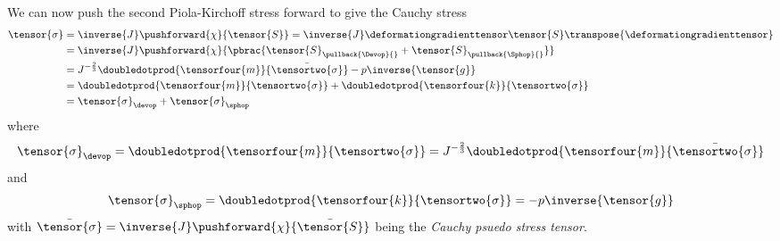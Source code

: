 We can now push the second Piola-Kirchoff stress forward to give the Cauchy
stress \ie
\begin{equation}
  \begin{split}
    \tensor{\sigma}&=\inverse{J}\pushforward{\chi}{\tensor{S}}=\inverse{J}\deformationgradienttensor\tensor{S}\transpose{\deformationgradienttensor}
    \\
    &=\inverse{J}\pushforward{\chi}{\pbrac{\tensor{S}_{\pullback{\Devop}{}}+\tensor{S}_{\pullback{\Sphop}{}}}}\\
    &=J^{-\frac{2}{3}}\doubledotprod{\tensorfour{m}}{\bar{\tensortwo{\sigma}}}-p\inverse{\tensor{g}}\\
    &=\doubledotprod{\tensorfour{m}}{\tensortwo{\sigma}}+\doubledotprod{\tensorfour{k}}{\tensortwo{\sigma}}\\
    &=\tensor{\sigma}_{\devop}+\tensor{\sigma}_{\sphop}
  \end{split}
\end{equation}
where
\begin{equation}
  \tensor{\sigma}_{\devop}=\doubledotprod{\tensorfour{m}}{\tensortwo{\sigma}}=J^{-\frac{2}{3}}\doubledotprod{\tensorfour{m}}{\bar{\tensortwo{\sigma}}}
  \label{eqn:DeviatoricCauchyStress}
\end{equation}
and
\begin{equation}
  \tensor{\sigma}_{\sphop}=\doubledotprod{\tensorfour{k}}{\tensortwo{\sigma}}=-p\inverse{\tensor{g}}
  \label{eqn:SphericalCauchyStress}
\end{equation}
with $\bar{\tensor{\sigma}}=\inverse{J}\pushforward{\chi}{\bar{\tensor{S}}}$
being the \emph{Cauchy psuedo stress
  tensor}.

